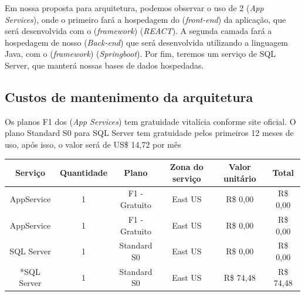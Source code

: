 \documentclass[
    12pt,               %
    openright,          %
    oneside,
    a4paper,            %
    english,            %
    brazil              %
   ]{ifsp-spo-inf-ctds}
\begin{document}
Em nossa proposta para arquitetura, podemos observar o uso de 2 (\textit{App Services}), onde o primeiro fará a hospedagem do (\textit{front-end}) da aplicação, que será desenvolvida com o (\textit{framework}) (\textit{REACT}). A segunda camada fará a hospedagem de nosso (\textit{Back-end}) que será desenvolvida utilizando a linguagem Java, com o (\textit{framework}) (\textit{Springboot}).
Por fim, teremos um serviço de SQL Server, que manterá nossas bases de dados hospedadas.

\subsection{Custos de mantenimento da arquitetura}
Os planos F1 dos (\textit{App Services}) tem gratuidade vitalícia conforme site oficial.
O plano Standard S0 para SQL Server tem gratuidade pelos primeiros 12 meses de uso, após isso, o valor será de US\$ 14,72 por mês
\begin{table}[h]
\begin{tabular}{|c|c|c|c|c|c|}
\hline
\textbf{Serviço} & \textbf{Quantidade} & \textbf{Plano} & \textbf{Zona do serviço} & \textbf{Valor unitário} & \textbf{Total} \\ \hline
AppService & 1 & F1 - Gratuito & East US & R\$ 0,00 & R\$ 0,00 \\ \hline
AppService & 1 & F1 - Gratuito & East US & R\$ 0,00 & R\$ 0,00 \\ \hline
SQL Server & 1 & Standard S0 & East US & R\$ 0,00 & R\$ 0,00 \\ \hline
*SQL Server & 1 & Standard S0 & East US & R\$ 74,48 & R\$ 74,48 \\ \hline
\end{tabular}
\end{table}
\end{document}
